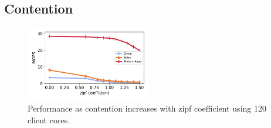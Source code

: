 \subsection{Contention}
\begin{figure}
  \centering
  \includegraphics[width=0.485\textwidth]{fig/contention.pdf}

    \caption{Performance as contention increases with zipf coefficient using 120 client cores.
    }

    \label{fig:packet_size}
\end{figure}
